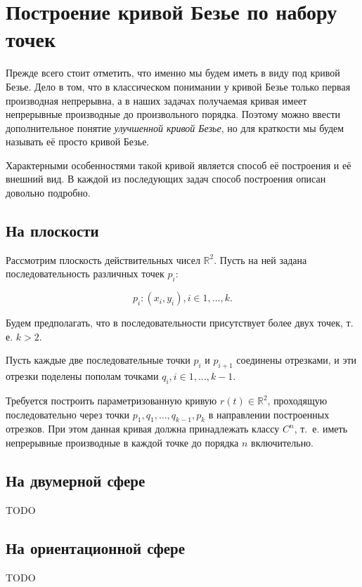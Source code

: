 \section{Построение кривой Безье по набору точек}

Прежде всего стоит отметить, что именно мы будем иметь в виду под кривой Безье. Дело в том, что в классическом
понимании у кривой Безье только первая производная непрерывна, а в наших задачах получаемая кривая имеет непрерывные
производные до произвольного порядка. Поэтому можно ввести дополнительное понятие \textit{улучшенной кривой Безье},
но для краткости мы будем называть её просто кривой Безье.

Характерными особенностями такой кривой является способ её построения и её внешний вид. В каждой из последующих задач
способ построения описан довольно подробно.

\subsection*{На плоскости}

Рассмотрим плоскость действительных чисел $\mathbb{R}^2$. Пусть на ней задана последовательность различных точек $p_i$:

$${p_i: (x_i, y_i)}, i \in {1, \dots, k}.$$

Будем предполагать, что в последовательности присутствует более двух точек, т. е. $k > 2$.

Пусть каждые две последовательные точки $p_i$ и $p_{i+1}$ соединены отрезками, и эти отрезки поделены пополам точками
$q_i, i \in {1, \dots, k-1}$.

Требуется построить параметризованную кривую $r(t) \in \mathbb{R}^2$, проходящую последовательно через точки $p_1,
q_1, \dots, q_{k-1}, p_k$ в направлении построенных отрезков. При этом данная кривая должна принадлежать классу
$C^n$, т.~е. иметь непрерывные производные в каждой точке до порядка $n$ включительно.

\subsection*{На двумерной сфере}

TODO

\subsection*{На ориентационной сфере}

TODO

